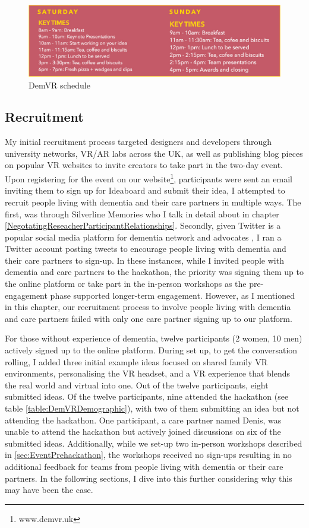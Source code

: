 \begin{figure}
\centering
\includegraphics[width=.8\linewidth]{Images/DemVR/DemVRHackathonSchedule.jpg}
\caption{DemVR schedule}
\label{fig:schedule}
\end{figure}

\subsection{Recruitment}
\label{sec:EventRecruitment}
My initial recruitment process targeted designers and developers through university networks, VR/AR labs across the UK, as well as publishing blog pieces on popular VR websites to invite creators to take part in the two-day event. Upon registering for the event on our website\footnote{www.demvr.uk}, participants were sent an email inviting them to sign up for Ideaboard and submit their idea, I attempted to recruit people living with dementia and their care partners in multiple ways. The first, was through Silverline Memories who I talk in detail about in chapter \ref{NegotatingReseacherParticipantRelationships}. Secondly, given Twitter is a popular social media platform for dementia network and advocates \citep{talbot_how_2020}, I ran a Twitter account posting tweets to encourage people living with dementia and their care partners to sign-up. In these instances, while I invited people with dementia and care partners to the hackathon, the priority was signing them up to the online platform or take part in the in-person workshops as the pre-engagement phase supported longer-term engagement. However, as I mentioned in this chapter, our recruitment process to involve people living with dementia and care partners failed with only one care partner signing up to our platform.

For those without experience of dementia, twelve participants (2 women, 10 men) actively signed up to the online platform. During set up, to get the conversation rolling, I added three initial example ideas focused on shared family VR environments, personalising the VR headset, and a VR experience that blends the real world and virtual into one. Out of the twelve participants, eight submitted ideas. Of the twelve participants, nine attended the hackathon (see table \ref{table:DemVRDemographic}), with two of them submitting an idea but not attending the hackathon. One participant, a care partner named Denis, was unable to attend the hackathon but actively joined discussions on six of the submitted ideas. Additionally, while we set-up two in-person workshops described in \ref{sec:EventPrehackathon}, the workshops received no sign-ups resulting in no additional feedback for teams from people living with dementia or their care partners. In the following sections, I dive into this further considering why this may have been the case. 

